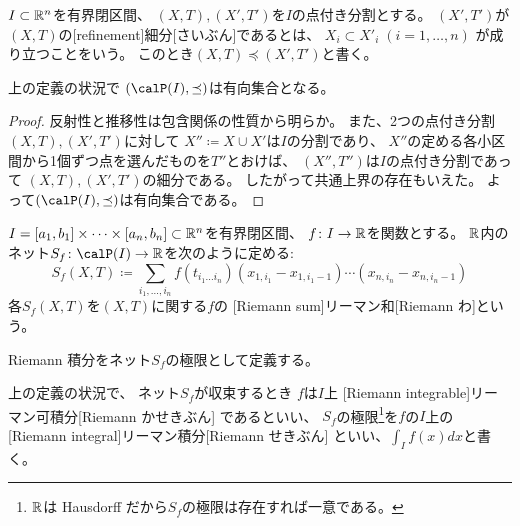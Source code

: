 \documentclass[report]{jlreq}
\begin{document}
\begin{definition}[細分]
    $I \subset \mathbb{R}^n$を有界閉区間、
    $(X, T), (X', T')$を$I$の点付き分割とする。
    $(X', T')$が$(X, T)$の[refinement]{細分}[さいぶん]であるとは、
    $X_i \subset X'_i \; (i = 1, \dots, n)$
    が成り立つことをいう。
    このとき$(X, T) \preceq (X', T')$と書く。
\end{definition}

\begin{lemma}
    上の定義の状況で
    $(\calP(I), \preceq)$は有向集合となる。
\end{lemma}

\begin{proof}
    反射性と推移性は包含関係の性質から明らか。
    また、2つの点付き分割$(X, T), (X', T')$に対して
    $X'' \coloneqq X \cup X'$は$I$の分割であり、
    $X''$の定める各小区間から1個ずつ点を選んだものを$T''$とおけば、
    $(X'', T'')$は$I$の点付き分割であって
    $(X, T), (X', T')$の細分である。
    したがって共通上界の存在もいえた。
    よって$(\calP(I), \preceq)$は有向集合である。
\end{proof}

\begin{definition}[Riemann 和]
    $I = [a_1, b_1] \times \cdots \times [a_n, b_n] \subset \mathbb{R}^n$を有界閉区間、
    $f \colon I \to \mathbb{R}$を関数とする。
    $\mathbb{R}$内のネット$S_f \colon \calP(I) \to \R$を次のように定める:
    \begin{equation}
        S_f(X, T)
            \coloneqq
            \sum_{i_1, \dots, i_n} f(t_{i_1 \dots i_n})
            (x_{1, i_1} - x_{1, i_1 - 1}) \cdots (x_{n, i_n} - x_{n, i_n - 1})
    \end{equation}
    各$S_f(X, T)$を$(X, T)$に関する$f$の
    [Riemann sum]{リーマン和}[Riemann わ]という。
\end{definition}

Riemann 積分をネット$S_f$の極限として定義する。

\begin{definition}[Riemann 積分]
    上の定義の状況で、
    ネット$S_f$が収束するとき
    $f$は$I$上
    [Riemann integrable]{リーマン可積分}[Riemann かせきぶん]
    であるといい、
    $S_f$の極限\footnote{
        $\mathbb{R}$は Hausdorff だから$S_f$の極限は存在すれば一意である。
    }を$f$の$I$上の
    [Riemann integral]{リーマン積分}[Riemann せきぶん]
    といい、$\int_I f(x) dx$と書く。
\end{definition}
\end{document}
